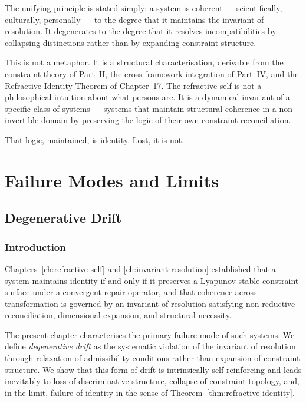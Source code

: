 \documentclass[11pt,openany]{book}
\begin{document}
The unifying principle is stated simply: a system is
coherent --- scientifically, culturally, personally --- to
the degree that it maintains the invariant of resolution.
It degenerates to the degree that it resolves
incompatibilities by collapsing distinctions rather than by
expanding constraint structure.

This is not a metaphor.  It is a structural characterisation,
derivable from the constraint theory of Part~II, the
cross-framework integration of Part~IV, and the Refractive
Identity Theorem of Chapter~17.  The refractive self is not
a philosophical intuition about what persons are.  It is a
dynamical invariant of a specific class of systems ---
systems that maintain structural coherence in a
non-invertible domain by preserving the logic of their own
constraint reconciliation.

That logic, maintained, is identity.  Lost, it is not.


\part{Failure Modes and Limits}


\chapter{Degenerative Drift}
\label{ch:degenerative-drift}

\section{Introduction}
\label{sec:intro-degenerative}

Chapters~\ref{ch:refractive-self} and
\ref{ch:invariant-resolution} established that a system
maintains identity if and only if it preserves a
Lyapunov-stable constraint surface under a convergent
repair operator, and that coherence across transformation
is governed by an invariant of resolution satisfying
non-reductive reconciliation, dimensional expansion, and
structural necessity.

The present chapter characterises the primary failure mode
of such systems.  We define \emph{degenerative drift} as
the systematic violation of the invariant of resolution
through relaxation of admissibility conditions rather than
expansion of constraint structure.  We show that this form
of drift is intrinsically self-reinforcing and leads
inevitably to loss of discriminative structure, collapse of
constraint topology, and, in the limit, failure of identity
in the sense of Theorem~\ref{thm:refractive-identity}.
\end{document}
